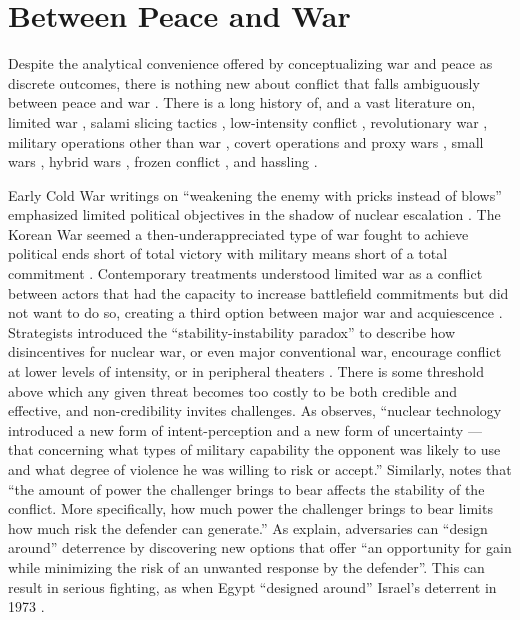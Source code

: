 \documentclass[11pt,letterpaper,pdftex,dvipsnames,table]{article}
\begin{document}
\section{Between Peace and War}
Despite the analytical convenience offered by conceptualizing war and peace as discrete outcomes, there is nothing new about conflict that falls ambiguously between peace and war \citep{lebow_futurewar_2010, libiseller_warpeacereaffirming_2021}. There is a long history of, and a vast literature on, limited war \citep{kissinger_militarypolicydefense_1955, osgood_reappraisallimitedwar_1969}, salami slicing tactics \citep{schelling_armsinfluence_1966}, low-intensity conflict \citep{turbiville_prefacefuturetrends_2002}, revolutionary war \citep{shy_revolutionarywar_1986}, military operations other than war \citep{kinross_clausewitzlowintensityconflict_2004}, covert operations and proxy wars \citep{carson_secretwarscovert_2018, orourke_covertregimechange_2018}, small wars \citep{olson_conceptsmallwars_1990}, hybrid wars \citep{lanoszka_russianhybridwarfare_2016}, frozen conflict \citep{driscoll_friendsthesebrinkmanship_2016}, and hassling \citep{schram_hasslinghowstates_2020}.

Early Cold War writings on “weakening the enemy with pricks instead of blows” emphasized limited political objectives in the shadow of nuclear escalation \citep[186]{hart_strategyindirectapproach_1954}. The Korean War seemed a then-underappreciated type of war fought to achieve political ends short of total victory with military means short of a total commitment \citep{osgood_reappraisallimitedwar_1969}. Contemporary treatments understood limited war as a conflict between actors that had the capacity to increase battlefield commitments but did not want to do so, creating a third option between major war and acquiescence \citep{brodie_morelimitedwar_1957, kissinger_strategyorganization_1957}. Strategists introduced the ``stability-instability paradox'' to describe how disincentives for nuclear war, or even major conventional war, encourage conflict at lower levels of intensity, or in peripheral theaters \citep{jervis_illogicamericannuclear_1984, sagan_spreadnuclearweapons_2003}. There is some threshold above which any given threat becomes too costly to be both credible and effective, and non-credibility invites challenges. As \citet[167]{snyder_balancepowerbalance_1965} observes, “nuclear technology introduced a new form of intent-perception and a new form of uncertainty — that concerning what types of military capability the opponent was likely to use and what degree of violence he was willing to risk or accept.” Similarly, \citet[598]{powell_nuclearbrinkmanshiplimited_2015} notes that “the amount of power the challenger brings to bear affects the stability of the conflict. More specifically, how much power the challenger brings to bear limits how much risk the defender can generate.” As \citet[173]{george_deterrenceforeignpolicy_1989} explain, adversaries can ``design around'' deterrence by discovering new options that offer “an opportunity for gain while minimizing the risk of an unwanted response by the defender”. This can result in serious fighting, as when Egypt “designed around” Israel’s deterrent in 1973 \citep{stein_calculationmiscalculationconventional_1989}.
\end{document}
